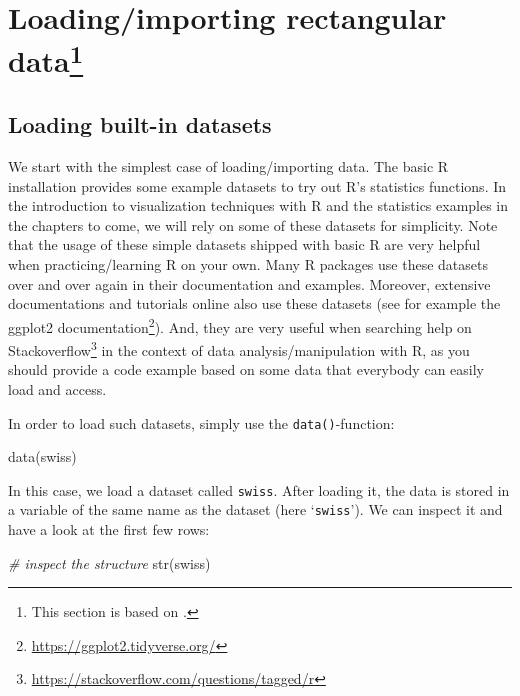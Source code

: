 \documentclass[
  12pt,
]{style/krantz}
\newenvironment{Shaded}{\begin{snugshade}}{\end{snugshade}}
\newcommand{\CommentTok}[1]{\textcolor[rgb]{0.56,0.35,0.01}{\textit{#1}}}
\newcommand{\FunctionTok}[1]{\textcolor[rgb]{0.00,0.00,0.00}{#1}}
\newcommand{\NormalTok}[1]{#1}
\renewcommand{\href}[2]{#2\footnote{\url{#1}}}
\begin{document}
\hypertarget{loadingimporting-rectangular-data}{%
\section[Loading/importing rectangular data]{\texorpdfstring{Loading/importing rectangular data\footnote{This section is based on \citet{umatter_2018}.}}{Loading/importing rectangular data}}\label{loadingimporting-rectangular-data}}

\hypertarget{loading-built-in-datasets}{%
\subsection{Loading built-in datasets}\label{loading-built-in-datasets}}

We start with the simplest case of loading/importing data. The basic R installation provides some example datasets to try out R's statistics functions. In the introduction to visualization techniques with R and the statistics examples in the chapters to come, we will rely on some of these datasets for simplicity. Note that the usage of these simple datasets shipped with basic R are very helpful when practicing/learning R on your own. Many R packages use these datasets over and over again in their documentation and examples. Moreover, extensive documentations and tutorials online also use these datasets (see for example the \href{https://ggplot2.tidyverse.org/}{ggplot2 documentation}). And, they are very useful when searching help on \href{https://stackoverflow.com/questions/tagged/r}{Stackoverflow} in the context of data analysis/manipulation with R, as you should provide a code example based on some data that everybody can easily load and access.

In order to load such datasets, simply use the \texttt{data()}-function:

\begin{Shaded}
\begin{Highlighting}[]
\FunctionTok{data}\NormalTok{(swiss)}
\end{Highlighting}
\end{Shaded}

In this case, we load a dataset called \texttt{swiss}. After loading it, the data is stored in a variable of the same name as the dataset (here `\texttt{swiss}'). We can inspect it and have a look at the first few rows:

\begin{Shaded}
\begin{Highlighting}[]
\CommentTok{\# inspect the structure}
\FunctionTok{str}\NormalTok{(swiss)}
\end{Highlighting}
\end{Shaded}
\end{document}
